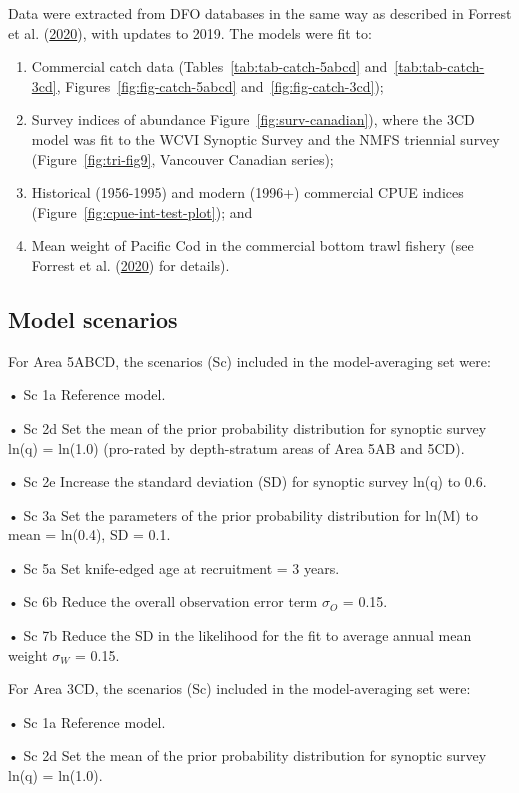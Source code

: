 \documentclass[11pt]{book}
\begin{document}
Data were extracted from DFO databases in the same way as described in Forrest et al. (\protect\hyperlink{ref-forrest2020}{2020}), with updates to 2019. The models were fit to:
\begin{enumerate}
\def\labelenumi{\arabic{enumi}.}
\item
  Commercial catch data (Tables~\ref{tab:tab-catch-5abcd} and~\ref{tab:tab-catch-3cd}, Figures~\ref{fig:fig-catch-5abcd} and~\ref{fig:fig-catch-3cd});
\item
  Survey indices of abundance Figure~\ref{fig:surv-canadian}), where the 3CD model was fit to the WCVI Synoptic Survey and the NMFS triennial survey (Figure~\ref{fig:tri-fig9}, Vancouver Canadian series);
\item
  Historical (1956-1995) and modern (1996+) commercial CPUE indices (Figure~\ref{fig:cpue-int-test-plot}); and
\item
  Mean weight of Pacific Cod in the commercial bottom trawl fishery (see Forrest et al. (\protect\hyperlink{ref-forrest2020}{2020}) for details).
\end{enumerate}
\hypertarget{model-scenarios}{%
\subsection{Model scenarios}\label{model-scenarios}}

For Area 5ABCD, the scenarios (Sc) included in the model-averaging set were:

• Sc 1a Reference model.

• Sc 2d Set the mean of the prior probability distribution for synoptic survey ln(q) = ln(1.0) (pro-rated by depth-stratum areas of Area 5AB and 5CD).

• Sc 2e Increase the standard deviation (SD) for synoptic survey ln(q) to 0.6.

• Sc 3a Set the parameters of the prior probability distribution for ln(M) to mean = ln(0.4), SD = 0.1.

• Sc 5a Set knife-edged age at recruitment = 3 years.

• Sc 6b Reduce the overall observation error term \(\sigma_O\) = 0.15.

• Sc 7b Reduce the SD in the likelihood for the fit to average annual mean weight \(\sigma_W\) = 0.15.

For Area 3CD, the scenarios (Sc) included in the model-averaging set were:

• Sc 1a Reference model.

• Sc 2d Set the mean of the prior probability distribution for synoptic survey ln(q) = ln(1.0).
\end{document}
